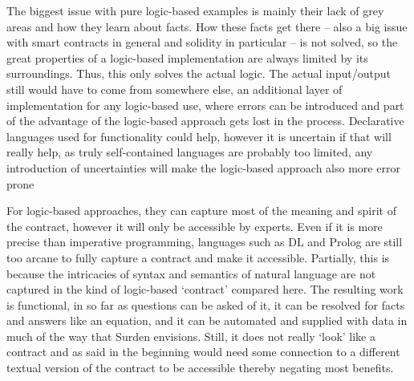 \documentclass{article}
\begin{document}
The biggest issue with pure logic-based examples is mainly their lack of grey areas and how they learn about facts. %
How these facts get there – also a big issue with smart contracts in general and solidity in particular  – is not solved, so the great properties of a logic-based implementation are always limited by its surroundings. 
Thus, this only solves the actual logic. The actual input/output still would have to come from somewhere else, an
additional layer of implementation for any logic-based use, where errors can be introduced and part of the advantage of the logic-based approach gets lost in the process. %
Declarative languages used for functionality could help, however it is uncertain if that will really help, as truly self-contained languages are probably too limited, any introduction of uncertainties will make the logic-based approach also more error prone

For logic-based approaches, they can capture most of the meaning and spirit of the contract, however it will only be accessible by experts. Even if it is more precise than imperative programming, languages such as DL and Prolog are still too arcane to fully capture a contract and make it accessible. Partially, this is because the intricacies of syntax and semantics of natural language are not captured in the kind of logic-based ‘contract’ compared here. The resulting work is functional, in so far as questions can be asked of it, it can be resolved for facts and answers like an equation, and it can be automated and supplied with data in much of the way that Surden envisions. Still, it does not really ‘look’ like a contract and as said in the beginning would need some connection to a different textual version of the contract to be accessible %
thereby negating most benefits.
\end{document}
